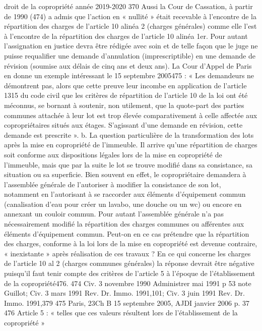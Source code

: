 droit de la copropriété année 2019-2020
370
Aussi la Cour de Cassation, à partir de 1990 (474) a admis que l'action en « nullité » était recevable à l'encontre de la répartition des charges de l'article 10 alinéa 2 (charges générales) comme elle l'est à l'encontre de la répartition des charges de l'article 10 alinéa 1er.
Pour autant l’assignation en justice devra être rédigée avec soin et de telle façon que le juge ne puisse requalifier une demande d’annulation (imprescriptible) en une demande de révision (soumise aux délais de cinq ans et deux ans).
La Cour d’Appel de Paris en donne un exemple intéressant le 15 septembre 2005475 :
« Les demandeurs ne démontrent pas, alors que cette preuve leur incombe en application de l’article 1315 du code civil que les critères de répartition de l’article 10 de la loi ont été méconnus, se bornant à soutenir, non utilement, que la quote-part des parties communes attachée à leur lot est trop élevée comparativement à celle affectée aux copropriétaires situés aux étages. S’agissant d’une demande en révision, cette demande est prescrite ».
b. La question particulière de la transformation des lots après la mise en copropriété de l’immeuble.
Il arrive qu’une répartition de charges soit conforme aux dispositions légales lors de la mise en copropriété de l’immeuble, mais que par la suite le lot se trouve modifié dans sa consistance, sa situation ou sa superficie.
Bien souvent en effet, le copropriétaire demandera à l’assemblée générale de l’autoriser à modifier la consistance de son lot, notamment en l’autorisant à se raccorder aux éléments d’équipement commun (canalisation d’eau pour créer un lavabo, une douche ou un wc) ou encore en annexant un couloir commun. Pour autant l’assemblée générale n’a pas nécessairement modifié la répartition des charges communes ou afférentes aux éléments d’équipement commun.
Peut-on en ce cas prétendre que la répartition des charges, conforme à la loi lors de la mise en copropriété est devenue contraire, « inexistante » après réalisation de ces travaux ?
En ce qui concerne les charges de l’article 10 al 2 (charges communes générales) la réponse devrait être négative puisqu’il faut tenir compte des critères de l’article 5 à l’époque de l’établissement de la copropriété476.
474 Civ. 3 novembre 1990 Administrer mai 1991 p 53 note Guillot; Civ. 3 mars 1991 Rev. Dr. Immo. 1991,101; Civ. 3 juin 1991 Rev. Dr. Immo. 1991,379
475 Paris, 23\degres Ch B 15 septembre 2005, AJDI janvier 2006 p. 37
476 Article 5 : « telles que ces valeurs résultent lors de l'établissement de la copropriété »

